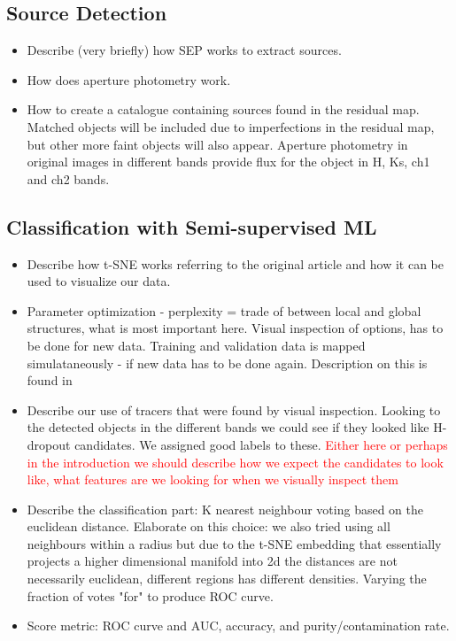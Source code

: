 \subsection{Source Detection}
\begin{itemize}
    \item Describe (very briefly) how SEP works to extract sources.
    \item How does aperture photometry work.
    \item How to create a catalogue containing sources found in the residual map. Matched objects will be included due to imperfections in the residual map, but other more faint objects will also appear. Aperture photometry in original images in different bands provide flux for the object in H, Ks, ch1 and ch2 bands.
\end{itemize}

\subsection{Classification with Semi-supervised ML}
\begin{itemize}
    \item Describe how t-SNE works referring to the original article \cite{Maaten_2008_tSNE} and how it can be used to visualize our data.
    \item Parameter optimization - perplexity = trade of between local and global structures, what is most important here. Visual inspection of options, has to be done for new data. Training and validation data is mapped simulataneously - if new data has to be done again. Description on this is found in \cite{Steinhardt_2020}
    \item Describe our use of tracers that were found by visual inspection. Looking to the detected objects in the different bands we could see if they looked like H-dropout candidates. We assigned good labels to these. \textcolor{red}{Either here or perhaps in the introduction we should describe how we expect the candidates to look like, what features are we looking for when we visually inspect them}
    \item Describe the classification part: K nearest neighbour voting based on the euclidean distance. Elaborate on this choice: we also tried using all neighbours within a radius but due to the t-SNE embedding that essentially projects a higher dimensional manifold into 2d the distances are not necessarily euclidean, different regions has different densities. Varying the fraction of votes "for" to produce ROC curve.
    \item Score metric: ROC curve and AUC, accuracy, and purity/contamination rate.
\end{itemize}